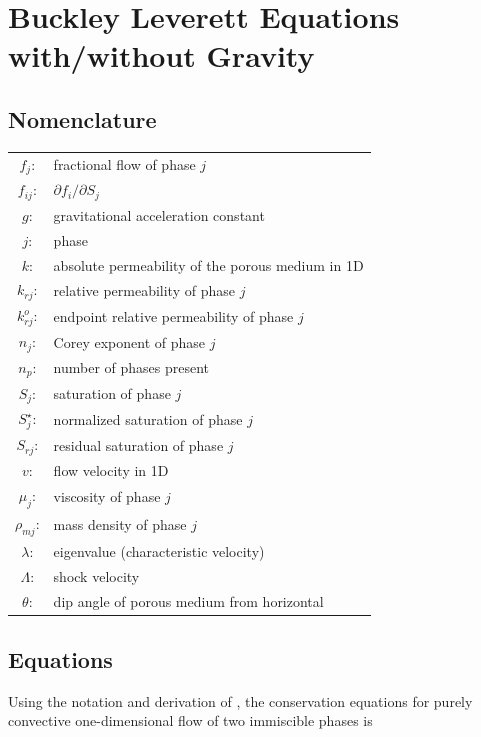 
\section{Buckley Leverett Equations with/without Gravity} 

\subsection{Nomenclature}
\begin{tabular}{c l}
%
$f_{j}$: & fractional flow of phase $j$ \\
%
$f_{ij}$: & $\partial f_{i}/\partial S_{j}$ \\
%
$g$: & gravitational acceleration constant \\
%
$j$: & phase \\
%
$k$: & absolute permeability of the porous medium in 1D \\
%
$k_{rj}$:& relative permeability of phase $j$ \\
%
$k^{o}_{rj}$: & endpoint relative permeability of phase $j$ \\
%
$n_{j}$: & Corey exponent of phase $j$\\
%
$n_{p}$: & number of phases present\\
%
$S_{j}$: & saturation of phase $j$\\
%
$S_{j}^{\star}$: & normalized saturation of phase $j$\\
%
$S_{rj}$: & residual saturation of phase $j$\\
%
$v$: & flow velocity in 1D\\
%
$\mu_{j}$: & viscosity of phase $j$\\
%
$\rho_{mj}$: & mass density of phase $j$\\
%
$\lambda$: & eigenvalue (characteristic velocity)\\
%
$\Lambda$: & shock velocity\\
%
$\theta$: & dip angle of porous medium from horizontal\\
%
\end{tabular}



\subsection{Equations}

Using the notation and derivation of \cite{Orr_2007}, the conservation equations for purely convective one-dimensional flow of two immiscible phases is

